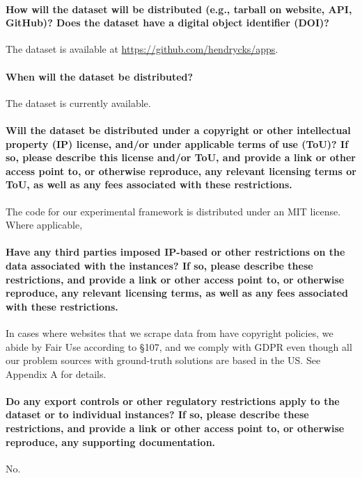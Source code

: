 \documentclass{article}
\begin{document}
\paragraph{How will the dataset will be distributed (e.g., tarball on website,
API, GitHub)? Does the dataset have a digital object identifier (DOI)?}
The dataset is available at \href{https://github.com/hendrycks/apps}{https://github.com/hendrycks/apps}.

\paragraph{When will the dataset be distributed?}
The dataset is currently available.

\paragraph{Will the dataset be distributed under a copyright or other intellectual property (IP) license, and/or under applicable terms of use
(ToU)? If so, please describe this license and/or ToU, and provide a link
or other access point to, or otherwise reproduce, any relevant licensing
terms or ToU, as well as any fees associated with these restrictions.}
The code for our experimental framework is distributed under an MIT license. Where applicable, 

\paragraph{Have any third parties imposed IP-based or other restrictions on
the data associated with the instances? If so, please describe these
restrictions, and provide a link or other access point to, or otherwise
reproduce, any relevant licensing terms, as well as any fees associated
with these restrictions.}
In cases where websites that we scrape data from have copyright policies, we abide by Fair Use according to §107, and we comply with GDPR even though all our problem sources with ground-truth solutions are based in the US. See Appendix A for details.

\paragraph{Do any export controls or other regulatory restrictions apply to
the dataset or to individual instances? If so, please describe these
restrictions, and provide a link or other access point to, or otherwise
reproduce, any supporting documentation.}
No.
\end{document}
